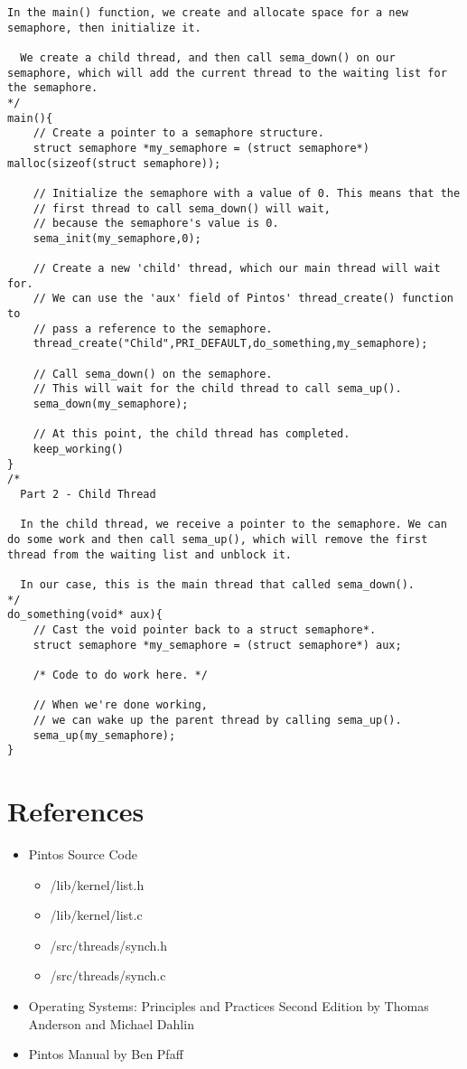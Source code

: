 \documentclass[11pt, letterpaper]{article}
\begin{document}
\begin{appendices}
\begin{lstlisting}[frame=single,basicstyle=\footnotesize]
  In the main() function, we create and allocate space for a new semaphore, then initialize it. 

  We create a child thread, and then call sema_down() on our semaphore, which will add the current thread to the waiting list for the semaphore.
*/
main(){
	// Create a pointer to a semaphore structure.
	struct semaphore *my_semaphore = (struct semaphore*) malloc(sizeof(struct semaphore));

	// Initialize the semaphore with a value of 0. This means that the 
	// first thread to call sema_down() will wait, 
	// because the semaphore's value is 0.
	sema_init(my_semaphore,0);

	// Create a new 'child' thread, which our main thread will wait for.
	// We can use the 'aux' field of Pintos' thread_create() function to 
	// pass a reference to the semaphore.
	thread_create("Child",PRI_DEFAULT,do_something,my_semaphore);
	
	// Call sema_down() on the semaphore. 
	// This will wait for the child thread to call sema_up().
	sema_down(my_semaphore);
	
	// At this point, the child thread has completed.
	keep_working()
}
/*
  Part 2 - Child Thread

  In the child thread, we receive a pointer to the semaphore. We can do some work and then call sema_up(), which will remove the first thread from the waiting list and unblock it.

  In our case, this is the main thread that called sema_down().
*/
do_something(void* aux){
	// Cast the void pointer back to a struct semaphore*.
	struct semaphore *my_semaphore = (struct semaphore*) aux;
	
	/* Code to do work here. */
	
	// When we're done working, 
	// we can wake up the parent thread by calling sema_up().
	sema_up(my_semaphore);
}
\end{lstlisting}

\end{appendices}

\pagebreak

\section*{References}

\begin{itemize}
\item Pintos Source Code
	\begin{itemize}
	\item /lib/kernel/list.h
	\item /lib/kernel/list.c
	\item /src/threads/synch.h
	\item /src/threads/synch.c
	\end{itemize}
\item Operating Systems: Principles and Practices Second Edition by Thomas Anderson and Michael Dahlin
\item Pintos Manual by Ben Pfaff
\end{itemize}
	
\end{document}
